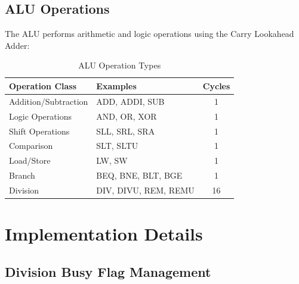 \documentclass[a4paper, 11pt]{article}
\begin{document}
\subsection{ALU Operations}

The ALU performs arithmetic and logic operations using the Carry Lookahead Adder:

\begin{table}[H]
\centering
\caption{ALU Operation Types}
\begin{tabular}{|l|l|c|}
\hline
\textbf{Operation Class} & \textbf{Examples} & \textbf{Cycles} \\
\hline
Addition/Subtraction & ADD, ADDI, SUB & 1 \\
\hline
Logic Operations & AND, OR, XOR & 1 \\
\hline
Shift Operations & SLL, SRL, SRA & 1 \\
\hline
Comparison & SLT, SLTU & 1 \\
\hline
Load/Store & LW, SW & 1 \\
\hline
Branch & BEQ, BNE, BLT, BGE & 1 \\
\hline
Division & DIV, DIVU, REM, REMU & 16 \\
\hline
\end{tabular}
\end{table}

\newpage

\section{Implementation Details}

\subsection{Division Busy Flag Management}
\end{document}
